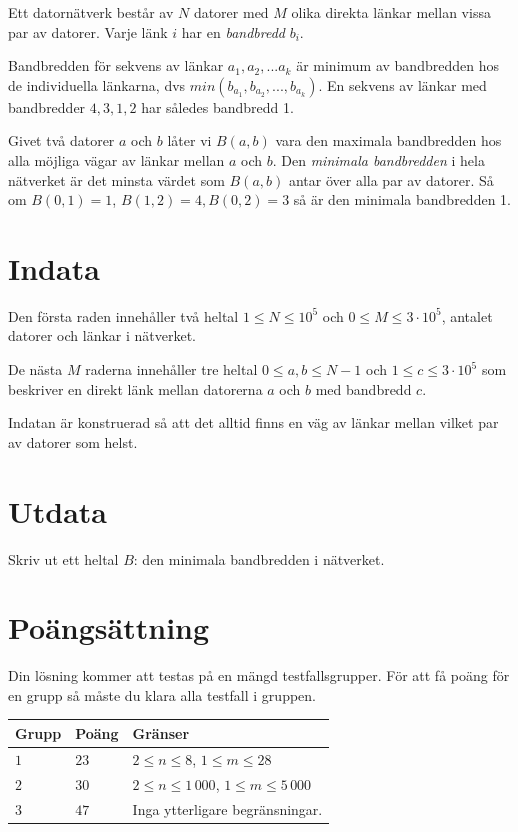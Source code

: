 Ett datornätverk består av $N$ datorer med $M$ olika direkta länkar mellan vissa par av datorer. Varje länk $i$ har en \emph{bandbredd} $b_i$.

Bandbredden för sekvens av länkar $a_1, a_2, ... a_k$ är minimum av bandbredden hos de individuella länkarna, dvs $min(b_{a_1}, b_{a_2}, ..., b_{a_k})$. En sekvens av länkar med bandbredder $4, 3, 1, 2$ har således bandbredd 1.

Givet två datorer $a$ och $b$ låter vi $B(a, b)$ vara den maximala bandbredden hos alla möjliga vägar av länkar mellan $a$ och $b$. Den \emph{minimala bandbredden} i hela nätverket är det minsta värdet som $B(a, b)$ antar över alla par av datorer. Så om $B(0, 1) = 1$, $B(1, 2) = 4, B(0, 2) = 3$ så är den minimala bandbredden 1.

\section*{Indata}
Den första raden innehåller två heltal $1 \le N \le 10^5$ och $0 \le M \le 3 \cdot 10^5$, antalet datorer och länkar i nätverket. 

De nästa $M$ raderna innehåller tre heltal $0 \le a, b \le N - 1$ och $1 \le c \le 3 \cdot 10^5$ som beskriver en direkt länk mellan datorerna $a$ och $b$ med bandbredd $c$.

Indatan är konstruerad så att det alltid finns en väg av länkar mellan vilket par av datorer som helst.

\section*{Utdata}
Skriv ut ett heltal $B$: den minimala bandbredden i nätverket.

\section*{Poängsättning}
Din lösning kommer att testas på en mängd testfallsgrupper. För att få poäng
för en grupp så måste du klara alla testfall i gruppen.

\noindent
\begin{tabular}{| l | l | p{12cm} |}
  \hline
  \textbf{Grupp} & \textbf{Poäng} & \textbf{Gränser} \\ \hline
  $1$    & $23$      & $2 \le n \le 8$, $1 \le m \le 28$ \\ \hline
  $2$    & $30$      & $2 \le n \le 1\,000$, $1 \le m \le 5\,000$ \\ \hline
  $3$    & $47$      & Inga ytterligare begränsningar. \\ \hline
\end{tabular}

